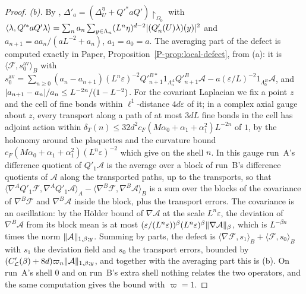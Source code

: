 \documentclass[11pt]{preprint}
\DeclarePairedDelimiter{\abs}{\lvert}{\rvert}
\DeclarePairedDelimiter{\norm}{\lVert}{\rVert}
\numberwithin{equation}{section}
\theoremstyle{definition}
\theoremstyle{remark}
\theoremstyle{plain}
\begin{document}
\begin{proof}
\emph{(b).} By \cite[(3.23), (3.24), p.~394]{BalabanPBG}, $\Delta'_a = (\Delta^\eta_U + Q'^*aQ')\restriction_{\Omega_0}$ with $\langle\lambda, Q'^*aQ'\lambda\rangle = \sum_na_n\sum_{y \in \Lambda_n}(L^n\eta)^{d-2}\abs{(Q'_n(U)\lambda)(y)}^2$ and $a_{n+1} = aa_n/(aL^{-2} + a_n)$, $a_1 = a_0 = a$. The averaging part of the defect is computed exactly in Paper, Proposition~\ref{P-prop:local-defect}, from (a): it is $\langle\mathcal F, s_0^{\mathrm{av}}\rangle_B$ with $s_0^{\mathrm{av}} = \sum_{n \geq 0}(a_n - a_{n+1})(L^n\varepsilon)^{-2}Q'^{B*}_{n+1}1_{\Lambda^A_n}Q'^B_{n+1}\mathcal A - a(\varepsilon/L)^{-2}1_{\Lambda^B_0}\mathcal A$, and $\abs{a_{n+1} - a_n}/a_n \leq L^{-2n}/(1 - L^{-2})$. For the covariant Laplacian we fix a point $z$ and the cell of fine bonds within $\ell^1$-distance $4d\varepsilon$ of it; in a complex axial gauge about $z$, every transport along a path of at most $3dL$ fine bonds in the cell has adjoint action within $\delta_T(n) \leq 32d^2c_F(M\alpha_0 + \alpha_1 + \alpha_1^2)L^{-2n}$ of $1$, by the holonomy around the plaquettes and the curvature bound $c_F(M\alpha_0 + \alpha_1 + \alpha_1^2)(L^n\varepsilon)^{-2}$ which \cite[(3.35), (3.37), p.~396]{BalabanPBG} give on the shell $n$. In this gauge run~A's difference quotient of $Q'_1\mathcal A$ is the average over a block of run~B's difference quotients of $\mathcal A$ along the transported paths, up to the transports, so that $\langle\nabla^AQ'_1\mathcal F, \nabla^AQ'_1\mathcal A\rangle_A - \langle\nabla^B\mathcal F, \nabla^B\mathcal A\rangle_B$ is a sum over the blocks of the covariance of $\nabla^B\mathcal F$ and $\nabla^B\mathcal A$ inside the block, plus the transport errors. The covariance is an oscillation: by the H\"older bound of $\nabla\mathcal A$ at the scale $L^n\varepsilon$, the deviation of $\nabla^B\mathcal A$ from its block mean is at most $(\varepsilon/(L^n\varepsilon))^\beta(L^n\varepsilon)^\beta\norm{\nabla\mathcal A}_\beta$, which is $L^{-\beta n}$ times the norm $\norm{\mathcal A}_{1,\beta;y}$. Summing by parts, the defect is $\langle\nabla\mathcal F, s_1\rangle_B + \langle\mathcal F, s_0\rangle_B$ with $s_1$ the deviation field and $s_0$ the transport errors, bounded by $(C'_{\mathcal L}(\beta) + 8d)\varpi_n\norm{\mathcal A}_{1,\beta;y}$, and together with the averaging part this is (b). On run~A's shell $0$ and on run~B's extra shell nothing relates the two operators, and the same computation gives the bound with $\varpi = 1$.


\end{proof}
\end{document}
